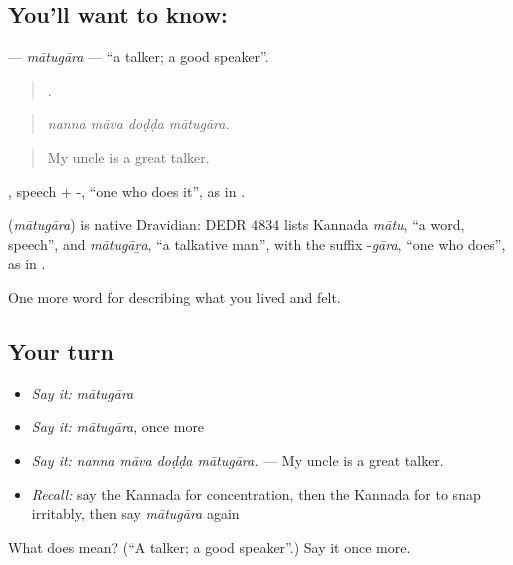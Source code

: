 \subsection*{You'll want to know: }
\textbf{} — \emph{mātugāra} — \textquotedblleft{}a talker; a good speaker\textquotedblright{}.

\begin{quote}
   .
\end{quote}

\begin{quote}
\emph{nanna māva doḍḍa mātugāra.}
\end{quote}

\begin{quote}
My uncle is a great talker.
\end{quote}

, speech + -, \textquotedblleft{}one who does it\textquotedblright{}, as in .

\begin{cousinweb}
\textbf{} (\emph{mātugāra}) is native Dravidian: DEDR 4834 lists Kannada \emph{mātu}, \textquotedblleft{}a word, speech\textquotedblright{}, and \emph{mātugāṟa}, \textquotedblleft{}a talkative man\textquotedblright{}, with the suffix -\emph{gāra}, \textquotedblleft{}one who does\textquotedblright{}, as in .
\end{cousinweb}

\begin{grammarlens}[title={What you've built}]
One more word for describing what you lived and felt.
\end{grammarlens}

\subsection*{Your turn}
\begin{itemize}
\raggedright
  \item \emph{Say it:} \emph{mātugāra}
  \item \emph{Say it:} \emph{mātugāra}, once more
  \item \emph{Say it:} \emph{nanna māva doḍḍa mātugāra.} — My uncle is a great talker.
  \item \emph{Recall:} say the Kannada for concentration, then the Kannada for to snap irritably, then say \emph{mātugāra} again
\end{itemize}

\begin{tcolorbox}[breakable,colback=teal!4,colframe=teal!35!black,title={Before you move on}]
What does  mean? (\textquotedblleft{}A talker; a good speaker\textquotedblright{}.) Say it once more.
\end{tcolorbox}
